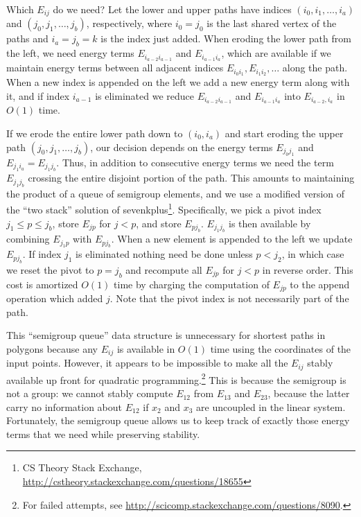 \documentclass[11pt]{article}
\begin{document}
Which $E_{ij}$ do we need?  Let the lower and upper paths have indices $(i_0, i_1, \ldots, i_a)$ and $(j_0, j_1, \ldots, j_b)$, respectively, where $i_0 = j_0$ is the last shared vertex of the paths
and $i_a = j_b = k$ is the index just added.  When eroding the lower path from the left, we need energy terms $E_{i_{a-2}i_{a-1}}$ and $E_{i_{a-1}i_{a}}$, which are available if we maintain
energy terms between all adjacent indices $E_{i_0i_1}, E_{i_1i_2}, \ldots$ along the path.  When a new index is appended on the left we add a new energy term along with it, and if index $i_{a-1}$ is
eliminated we reduce $E_{i_{a-2}i_{a-1}}$ and $E_{i_{a-1}i_{a}}$ into $E_{i_{a-2},i_a}$ in $O(1)$ time.

If we erode the entire lower path down to $(i_0,i_a)$ and start eroding the upper path $(j_0, j_1, \ldots, j_b)$, our decision depends on the energy terms $E_{j_0j_1}$ and $E_{j_1i_a} = E_{j_1j_b}$.
Thus, in addition to consecutive energy terms we need the term $E_{j_1j_b}$ crossing the entire disjoint portion of the path.  This amounts to maintaining the product of a queue of semigroup elements,
and we use a modified version of the ``two stack'' solution of sevenkplus\footnote{CS Theory Stack Exchange, \url{http://cstheory.stackexchange.com/questions/18655}}.  Specifically, we pick a pivot
index $j_1 \le p \le j_b$, store $E_{j p}$ for $j < p$, and store $E_{p j_b}$.  $E_{j_1 j_b}$ is then available by combining $E_{j_1 p}$ with $E_{p j_b}$.  When a new element is appended to the left
we update $E_{p j_b}$.  If index $j_1$ is eliminated nothing need be done unless $p < j_2$, in which case we reset the pivot to $p = j_b$ and recompute all $E_{j p}$ for $j < p$ in reverse order.
This cost is amortized $O(1)$ time by charging the computation of $E_{j p}$ to the append operation which added $j$.  Note that the pivot index is not necessarily part of the path.

This ``semigroup queue'' data structure is unnecessary for shortest paths in polygons because any $E_{ij}$ is available in $O(1)$ time using the coordinates of the input points.  However,
it appears to be impossible to make all the $E_{ij}$ stably available up front for quadratic programming.\footnote{For failed attempts, see \url{http://scicomp.stackexchange.com/questions/8090}.}
This is because the semigroup is not a group: we cannot stably compute $E_{12}$ from $E_{13}$ and $E_{23}$, because the latter
carry no information about $E_{12}$ if $x_2$ and $x_3$ are uncoupled in the linear system.
Fortunately, the semigroup queue allows us to keep track of exactly those energy terms that we need while preserving stability.
\end{document}
